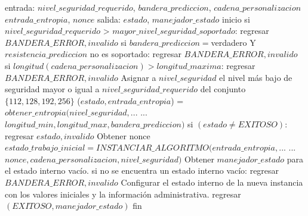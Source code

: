 \begin{description}
    \begin{pseudocodigo}[caption={DRBG, instanciación.}, label={drbg:1}]
      entrada:  $nivel\_seguridad\_requerido$, $bandera\_prediccion$, $cadena\_personalizacion$
                $entrada\_entropia$, $nonce$ 
      salida:   $estado$, $manejador\_estado$
      inicio
        si $nivel\_seguridad\_requerido$ > $mayor\_nivel\_seguridad\_soportado$:
          regresar $BANDERA\_ERROR, invalido$
        si $bandera\_prediccion = $verdadero Y $resistencia\_prediccion$ no es soportado:
          regresar $BANDERA\_ERROR, invalido$
        si $longitud(cadena\_personalizacion) > longitud\_maxima$:
          regresar $BANDERA\_ERROR, invalido$
        Asignar a $nivel\_seguridad$ el nivel más bajo de seguridad mayor o igual
          a $nivel\_seguridad\_requerido$ del conjunto $\{112, 128, 192, 256\}$
        ($estado, entrada\_entropia$) = $obtener\_entropia(nivel\_seguridad,$...
          ... $longitud\_min, longitud\_max, bandera\_prediccion)$
        si $(estado \neq EXITOSO)$:
          regresar $estado, invalido$ 
        Obtener nonce
        $estado\_trabajo\_inicial = INSTANCIAR\_ALGORITMO(entrada\_entropia,$...
          ... $nonce, cadena\_personalizacion, nivel\_seguridad)$
        Obtener $manejador\_estado$ para el estado interno vacío. 
        si no se encuentra un estado interno vacío:
          regresar $BANDERA\_ERROR, invalido$
        Configurar el estado interno de la nueva instancia con los valores iniciales
          y la información administrativa.
        regresar $(EXITOSO, manejador\_estado)$
      fin
    \end{pseudocodigo}
  

\end{description}

